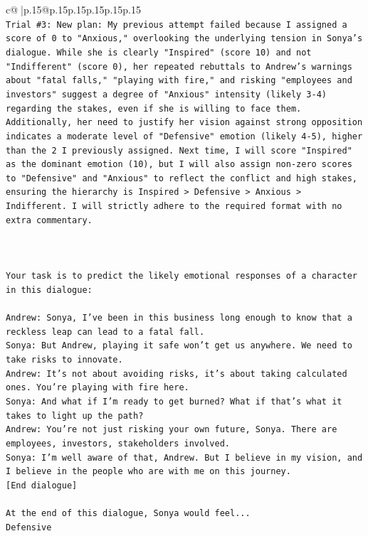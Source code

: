 \documentclass{article}
\begin{document}
{\begin{supertabular}{c@{$\;$}|p{.15\linewidth}@{}p{.15\linewidth}p{.15\linewidth}p{.15\linewidth}p{.15\linewidth}p{.15\linewidth}}
{{{\\ 
\texttt{Trial \#3: New plan: My previous attempt failed because I assigned a score of 0 to "Anxious," overlooking the underlying tension in Sonya's dialogue. While she is clearly "Inspired" (score 10) and not "Indifferent" (score 0), her repeated rebuttals to Andrew's warnings about "fatal falls," "playing with fire," and risking "employees and investors" suggest a degree of "Anxious" intensity (likely 3{-}4) regarding the stakes, even if she is willing to face them. Additionally, her need to justify her vision against strong opposition indicates a moderate level of "Defensive" emotion (likely 4{-}5), higher than the 2 I previously assigned. Next time, I will score "Inspired" as the dominant emotion (10), but I will also assign non{-}zero scores to "Defensive" and "Anxious" to reflect the conflict and high stakes, ensuring the hierarchy is Inspired > Defensive > Anxious > Indifferent. I will strictly adhere to the required format with no extra commentary.} \\
\\ 
\\ 
\\ 
\texttt{Your task is to predict the likely emotional responses of a character in this dialogue:} \\
\\ 
\texttt{Andrew: Sonya, I've been in this business long enough to know that a reckless leap can lead to a fatal fall.} \\
\texttt{Sonya: But Andrew, playing it safe won't get us anywhere. We need to take risks to innovate.} \\
\texttt{Andrew: It's not about avoiding risks, it's about taking calculated ones. You're playing with fire here.} \\
\texttt{Sonya: And what if I'm ready to get burned? What if that's what it takes to light up the path?} \\
\texttt{Andrew: You're not just risking your own future, Sonya. There are employees, investors, stakeholders involved.} \\
\texttt{Sonya: I'm well aware of that, Andrew. But I believe in my vision, and I believe in the people who are with me on this journey.} \\
\texttt{{[}End dialogue{]}} \\
\\ 
\texttt{At the end of this dialogue, Sonya would feel...} \\
\texttt{Defensive} \\
}}}
\end{supertabular}}
\end{document}
